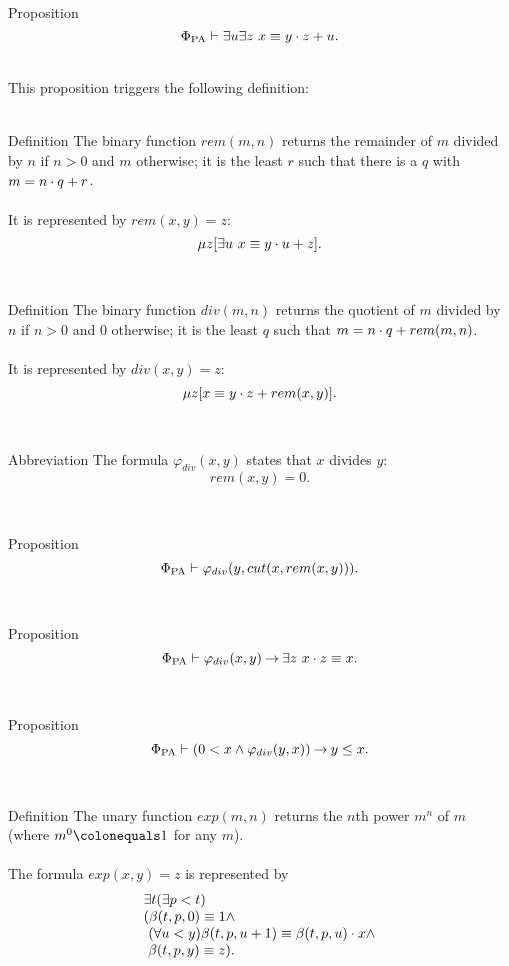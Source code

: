 \begin{theorem}{Proposition}
\[
\Phi_{\mathrm{PA}} \vdash \exists u \exists z \ x \equiv y \cdot z + u.
\]
\end{theorem}\ \\
This proposition triggers the following definition:\\
\ \\
\begin{definition}{Definition}
The binary function $rem(m, n)$ returns the remainder of $m$ divided by $n$ if $n > 0$ and $m$ otherwise; it is the least $r$ such that there is a $q$ with $m = n \cdot q + r$.\\
\ \\
It is represented by $rem(x, y) \equal z$:
\[
\mu z [\exists u \ x \equiv y \cdot u + z].
\]
\end{definition}\ \\
\begin{definition}{Definition}
The binary function $div(m, n)$ returns the quotient of $m$ divided by $n$ if $n > 0$ and $0$ otherwise; it is the least $q$ such that $m = n \cdot q + rem(m, n)$.\\
\ \\
It is represented by $div(x, y) \equal z$:
\[
\mu z [x \equiv y \cdot z + rem(x, y)].
\]
\end{definition}\ \\
\begin{definition}{Abbreviation}
The formula $\varphi_{div}(x, y)$ states that $x$ divides $y$:
\[
rem(x, y) \equal 0.
\]
\end{definition}\ \\
\begin{theorem}{Proposition}
\[
\Phi_{\mathrm{PA}} \vdash \varphi_{div}(y, cut(x, rem(x, y))).
\]
\end{theorem}\ \\
\begin{theorem}{Proposition}
\[
\Phi_{\mathrm{PA}} \vdash \varphi_{div}(x, y) \mathbin{\rightarrow} \exists z \ x \cdot z \equiv x.
\]
\end{theorem}\ \\
\begin{theorem}{Proposition}
\[
\Phi_{\mathrm{PA}} \vdash (0 < x \land \varphi_{div}(y, x)) \mathbin{\rightarrow} y \leq x.
\]
\end{theorem}\ \\
\begin{definition}{Definition} The unary function $exp(m, n)$ returns the $n$th power $m^n$ of $m$ (where $m^0 \colonequals 1$ for any $m$).\\
\ \\
The formula $exp(x, y) \equal z$ is represented by
\[
\begin{array}{l}
\exists t (\exists p < t) \cr
(\beta(t, p, 0) \equiv 1 \land \cr
\ (\forall u < y) \beta(t, p, u + 1) \equiv \beta(t, p, u) \cdot x \land \cr
\ \beta(t, p, y) \equiv z).
\end{array}
\]
\end{definition}\ \\

